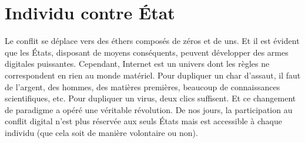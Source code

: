 \documentclass[article, french]{yReport}
\begin{document}
	
	\section{Individu contre État}
	Le conflit se déplace vers des éthers composés de zéros et de uns.
	Et il est évident que les États, disposant de moyens conséquents, peuvent développer des armes digitales puissantes.
	Cependant, Internet est un univers dont les règles ne correspondent en rien au monde matériel.
	Pour dupliquer un char d'assaut, il faut de l'argent, des hommes, des matières premières, beaucoup de connaissances scientifiques, etc.
	Pour dupliquer un virus, deux clics suffisent.
	Et ce changement de paradigme a opéré une véritable révolution.
	De nos jours, la participation au conflit digital n'est plus réservée aux seuls États mais est accessible à chaque individu (que cela soit de manière volontaire ou non).
	
\end{document}
